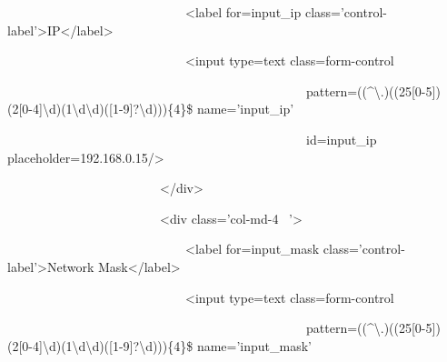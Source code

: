 {\ttfamily\color[rgb]{0.10980392,0.10980392,0.10980392}
    \ \ \ \ \ \ \ \ \ \ \ \ \ \ \ \ \ \ \ \ \ \ \ \ \ \ \ \ {\textless}label for={\textquotedbl}input\_ip{\textquotedbl}
    class='control-label'{\textgreater}IP{\textless}/label{\textgreater}}

{\ttfamily\color[rgb]{0.10980392,0.10980392,0.10980392}
    \ \ \ \ \ \ \ \ \ \ \ \ \ \ \ \ \ \ \ \ \ \ \ \ \ \ \ \ {\textless}input type={\textquotedbl}text{\textquotedbl}
    class={\textquotedbl}form-control {\textquotedbl} }

{\ttfamily\color[rgb]{0.10980392,0.10980392,0.10980392}
    \ \ \ \ \ \ \ \ \ \ \ \ \ \ \ \ \ \ \ \ \ \ \ \ \ \ \ \ \ \ \ \ \ \ \ \ \ \ \ \ \ \ \ \ \ \ \ pattern={\textquotedbl}((\^{}{\textbar}{\textbackslash}.)((25[0-5]){\textbar}(2[0-4]{\textbackslash}d){\textbar}(1{\textbackslash}d{\textbackslash}d){\textbar}([1-9]?{\textbackslash}d)))\{4\}\${\textquotedbl}
    name='input\_ip'}

{\ttfamily\color[rgb]{0.10980392,0.10980392,0.10980392}
    \ \ \ \ \ \ \ \ \ \ \ \ \ \ \ \ \ \ \ \ \ \ \ \ \ \ \ \ \ \ \ \ \ \ \ \ \ \ \ \ \ \ \ \ \ \ \ id={\textquotedbl}input\_ip{\textquotedbl}
    placeholder={\textquotedbl}192.168.0.15{\textquotedbl}/{\textgreater}}

{\ttfamily\color[rgb]{0.10980392,0.10980392,0.10980392}
    \ \ \ \ \ \ \ \ \ \ \ \ \ \ \ \ \ \ \ \ \ \ \ \ {\textless}/div{\textgreater}}

{\ttfamily\color[rgb]{0.10980392,0.10980392,0.10980392}
    \ \ \ \ \ \ \ \ \ \ \ \ \ \ \ \ \ \ \ \ \ \ \ \ {\textless}div class='col-md-4 \ {}'{\textgreater}}

{\ttfamily\color[rgb]{0.10980392,0.10980392,0.10980392}
    \ \ \ \ \ \ \ \ \ \ \ \ \ \ \ \ \ \ \ \ \ \ \ \ \ \ \ \ {\textless}label for={\textquotedbl}input\_mask{\textquotedbl}
    class='control-label'{\textgreater}Network Mask{\textless}/label{\textgreater}}

{\ttfamily\color[rgb]{0.10980392,0.10980392,0.10980392}
    \ \ \ \ \ \ \ \ \ \ \ \ \ \ \ \ \ \ \ \ \ \ \ \ \ \ \ \ {\textless}input type={\textquotedbl}text{\textquotedbl}
    class={\textquotedbl}form-control {\textquotedbl} }

{\ttfamily\color[rgb]{0.10980392,0.10980392,0.10980392}
    \ \ \ \ \ \ \ \ \ \ \ \ \ \ \ \ \ \ \ \ \ \ \ \ \ \ \ \ \ \ \ \ \ \ \ \ \ \ \ \ \ \ \ \ \ \ \ pattern={\textquotedbl}((\^{}{\textbar}{\textbackslash}.)((25[0-5]){\textbar}(2[0-4]{\textbackslash}d){\textbar}(1{\textbackslash}d{\textbackslash}d){\textbar}([1-9]?{\textbackslash}d)))\{4\}\${\textquotedbl}
    name='input\_mask'}

